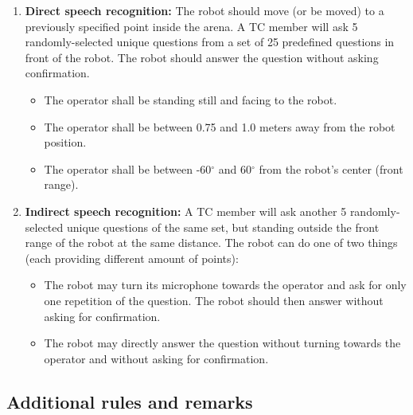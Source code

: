 \begin{enumerate}
\item \textbf{Direct speech recognition: } The robot should move (or be moved) to a previously specified point inside the arena. A TC member will ask 5 randomly-selected unique questions from a set of 25 predefined questions in front of the robot. The robot should answer the question without asking confirmation.
\begin{itemize}
\item The operator shall be standing still and facing to the robot.
\item The operator shall be between 0.75 and 1.0 meters away from the robot position.
\item The operator shall be between -60$^{\circ}$ and 60$^{\circ}$ from the robot's center (front range).
\end{itemize}
\item \textbf{Indirect speech recognition: } A TC member will ask another 5 randomly-selected unique questions of the same set, but standing outside the front range of the robot at the same distance. The robot can do one of two things (each providing different amount of points):
\begin{itemize}
\item The robot may turn its microphone towards the operator and ask for only one repetition of the question. The robot should then answer without asking for confirmation.
\item The robot may directly answer the question without turning towards the operator and without asking for confirmation.
\end{itemize}
\end{enumerate}


\subsection{Additional rules and remarks}

